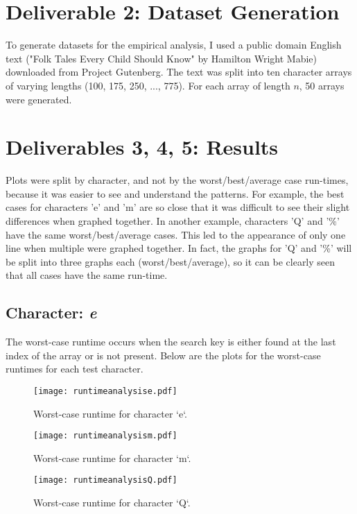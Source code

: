 \documentclass{article}
\begin{document}
\section{Deliverable 2: Dataset Generation}
To generate datasets for the empirical analysis, I used a public domain English text ("Folk Tales Every Child Should Know" by Hamilton Wright Mabie) downloaded from Project Gutenberg. The text was split into ten character arrays of varying lengths (100, 175, 250, ..., 775). For each array of length \( n \), 50 arrays were generated.

\section{Deliverables 3, 4, 5: Results}
Plots were split by character, and not by the worst/best/average case run-times, because it was easier to see and understand the patterns. For example, the best cases for characters 'e' and 'm' are so close that it was difficult to see their slight differences when graphed together. In another example, characters 'Q' and '\%' have the same worst/best/average cases. This led to the appearance of only one line when multiple were graphed together. In fact, the graphs for 'Q' and '\%' will be split into three graphs each (worst/best/average), so it can be clearly seen that all cases have the same run-time. 
	
\subsection{Character: \textit{e}}
The worst-case runtime occurs when the search key is either found at the last index of the array or is not present. Below are the plots for the worst-case runtimes for each test character.
	
	\begin{figure}[H]
		\centering
		\texttt{[image: runtimeanalysise.pdf]}
		\caption{Worst-case runtime for character `e`.}
	\end{figure}
	
	\begin{figure}[H]
		\centering
		\texttt{[image: runtimeanalysism.pdf]}
		\caption{Worst-case runtime for character `m`.}
	\end{figure}
	
	\begin{figure}[H]
		\centering
		\texttt{[image: runtimeanalysisQ.pdf]}
		\caption{Worst-case runtime for character `Q`.}
	\end{figure}
	
\end{document}
